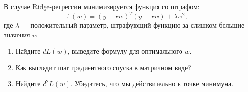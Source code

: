\begin{problem}{}
    В случае Ridge-регрессии минимизируется функция со штрафом:
	\[
	L(w) = (y - xw)^T(y - xw) + \lambda w^2,
	\]
	где $\lambda$ — положительный параметр, штрафующий функцию за слишком большие значения $w$.
	
	\begin{enumerate}
		\item Найдите $dL(w)$, выведите формулу для оптимального $w$.
		\item Как выглядит шаг градиентного спуска в матричном виде?
		\item Найдите $d^2L(w)$. Убедитесь, что мы действительно в точке минимума. 
	\end{enumerate}
	
	
\end{problem}
